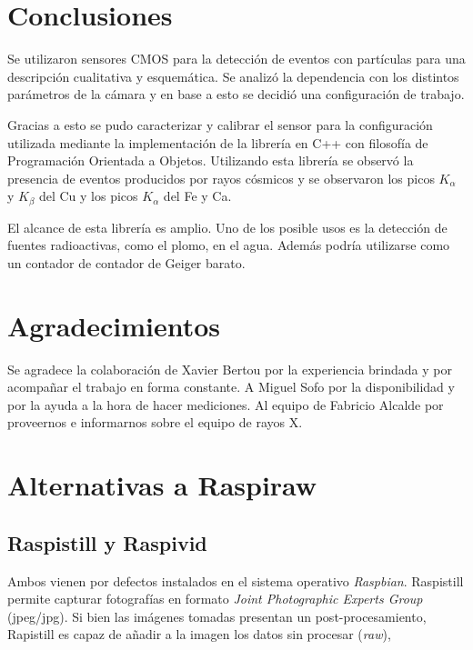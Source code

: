 \documentclass[twoside,twocolumn]{article}
\begin{document}

  \section{Conclusiones}
    Se utilizaron sensores CMOS para la detección de eventos con partículas para una descripción cualitativa y esquemática.
    Se analizó la dependencia con los distintos parámetros de la cámara y en base a esto se decidió una configuración de trabajo.

    Gracias a esto se pudo caracterizar y calibrar el sensor para la configuración utilizada mediante la implementación de la librería
    en C++ con filosofía de Programación Orientada a Objetos.
    Utilizando esta librería se observó la presencia de eventos producidos por rayos cósmicos y
    se observaron los picos $K_{\alpha}$ y $K_{\beta}$ del Cu y los picos $K_{\alpha}$ del Fe y Ca.

    El alcance de esta librería es amplio. Uno de los posible usos es la detección de fuentes radioactivas, como el plomo,
    en el agua. Además podría utilizarse como un contador de contador de Geiger barato.

  
  

  \section*{Agradecimientos}
    Se agradece la colaboración de Xavier Bertou por la experiencia brindada y por
    acompañar el trabajo en forma constante.
    A Miguel Sofo por la disponibilidad y por la ayuda a la hora de hacer mediciones.
    Al equipo de Fabricio Alcalde por proveernos e informarnos sobre el equipo de rayos X.

  \clearpage
  \appendix
  \section{Alternativas a Raspiraw}\label{sec:ap_alternatives}
  
  \subsection*{Raspistill y Raspivid}
    Ambos vienen por defectos instalados en el sistema operativo \emph{Raspbian}.
    Raspistill permite capturar fotografías en formato \emph{Joint Photographic Experts Group} (jpeg/jpg).
    Si bien las imágenes tomadas presentan un post-procesamiento, Rapistill es capaz de añadir a la imagen los datos sin procesar (\emph{raw}),
\end{document}
